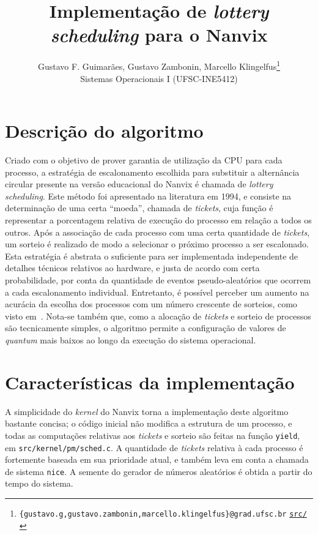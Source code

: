 \documentclass[12pt]{article}
\title{\textbf{Implementação de \emph{lottery scheduling} para o Nanvix}}
\author{
  Gustavo F. Guimarães, Gustavo Zambonin, Marcello Klingelfus\thanks{
    \texttt{\{gustavo.g,gustavo.zambonin,marcello.klingelfus\}@grad.ufsc.br}
    \hfill \texttt{\href{https://github.com/zambonin/nanvix}{src/}}
  } \\
  \small{Sistemas Operacionais I (UFSC-INE5412)}
}
\date{}
\begin{document}
\maketitle

\section{Descrição do algoritmo}

Criado com o objetivo de prover garantia de utilização da CPU para cada
processo, a estratégia de escalonamento escolhida para substituir a alternância
circular presente na versão educacional do Nanvix é chamada de \emph{lottery
scheduling}. Este método foi apresentado na literatura em 1994, e consiste na
determinação de uma certa ``moeda'', chamada de \emph{tickets}, cuja função é
representar a porcentagem relativa de execução do processo em relação a todos
os outros. Após a associação de cada processo com uma certa quantidade de
\emph{tickets}, um sorteio é realizado de modo a selecionar o próximo processo
a ser escalonado. \\

Esta estratégia é abstrata o suficiente para ser implementada independente de
detalhes técnicos relativos ao hardware, e justa de acordo com certa
probabilidade, por conta da quantidade de eventos pseudo-aleatórios que ocorrem
a cada escalonamento individual. Entretanto, é possível perceber um aumento
na acurácia da escolha dos processos com um número crescente de sorteios,
como visto em~\cite[seção 2.2]{Waldspurger:1994:LSF:1267638.1267639}. Nota-se
também que, como a alocação de \emph{tickets} e sorteio de processos são
tecnicamente simples, o algoritmo permite a configuração de valores de
\emph{quantum} mais baixos ao longo da execução do sistema operacional.

\section{Características da implementação}

A simplicidade do \emph{kernel} do Nanvix torna a implementação deste algoritmo
bastante concisa; o código inicial não modifica a estrutura de um processo, e
todas as computações relativas aos \emph{tickets} e sorteio são feitas na
função \texttt{yield}, em \texttt{src/kernel/pm/sched.c}. A quantidade de
\emph{tickets} relativa à cada processo é fortemente baseada em sua prioridade
atual, e também leva em conta a chamada de sistema \texttt{nice}. A semente
do gerador de números aleatórios é obtida a partir do tempo do sistema. \\
\end{document}

